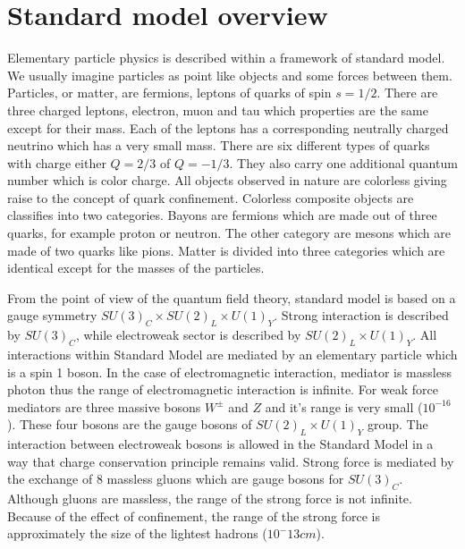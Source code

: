 \section{Standard model overview}

\par Elementary particle physics is described within a framework of standard model. We usually imagine particles as point like objects and some forces between them. Particles, or matter, are fermions, leptons of quarks of spin $s=1/2$. There are three charged leptons, electron, muon and tau which properties are the same except for their mass. Each of the leptons has a corresponding neutrally charged neutrino which has a very small mass. There are six different types of quarks with charge either $Q=2/3$ of $Q=-1/3$. They also carry one additional quantum number which is color charge. All objects observed in nature are colorless giving raise to the concept of quark confinement. Colorless composite objects are classifies into two categories. Bayons are fermions which are made out of three  quarks, for example proton or neutron. The other category are mesons which are made of two quarks like pions. Matter is divided into three categories which are identical except for the masses of the particles. 
\par From the point of view of the quantum field theory, standard model is based on a gauge symmetry $SU(3)_C \times SU(2)_L \times U(1)_Y$. Strong interaction is described by $SU(3)_C$, while electroweak sector is described by $SU(2)_L \times U(1)_Y$. All interactions within Standard Model are mediated by an elementary particle which is a spin 1 boson. In the case of electromagnetic interaction, mediator is massless photon thus the range of electromagnetic interaction is infinite. For weak force mediators are three massive bosons $W^{\pm}$ and $Z$ and it's range is very small ($10^{-16}$). These four bosons are the gauge bosons of $SU(2)_L \times U(1)_Y$ group. The interaction between electroweak bosons is allowed in the Standard Model in a way that charge conservation principle remains valid. Strong force is mediated by the exchange of 8 massless gluons which are gauge bosons for $SU(3)_C$. Although gluons are massless, the range of the strong force is not infinite. Because of the effect of confinement, the range of the strong force is approximately the size of the lightest hadrons ($10^-{13} cm$). 
